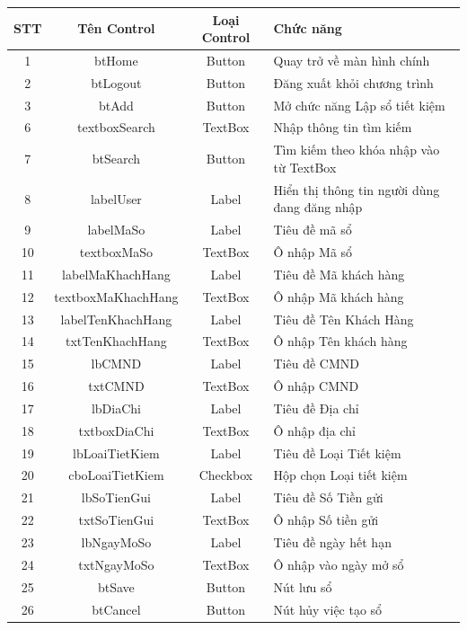 \documentclass{article}
\begin{document}
\begin{enumerate}
\begin{enumerate}
\begin{tabular}{|c|c|c| p{5cm}|}
							\hline
							STT & Tên Control & Loại Control & Chức năng \\
							\hline
							1 & btHome & Button & Quay trở về màn hình chính\\
							\hline
							2 & btLogout & Button & Đăng xuất khỏi chương trình \\
							\hline
							3 & btAdd & Button & Mở chức năng Lập sổ tiết kiệm \\
							\hline
							6 & textboxSearch & TextBox & Nhập thông tin tìm kiếm \\
							\hline
							7 & btSearch & Button & Tìm kiếm theo khóa nhập vào từ TextBox\\
							\hline
							8 & labelUser & Label & Hiển thị thông tin người dùng đang đăng nhập\\
							\hline
							9 & labelMaSo & Label & Tiêu đề mã sổ \\
							\hline
							10 & textboxMaSo & TextBox & Ô nhập Mã sổ \\
							\hline
							11 & labelMaKhachHang & Label & Tiêu đề Mã khách hàng \\
							\hline
							12 & textboxMaKhachHang & TextBox & Ô nhập Mã khách hàng \\
							\hline
							13 & labelTenKhachHang & Label & Tiêu đề Tên Khách Hàng \\
							\hline
							14 & txtTenKhachHang & TextBox & Ô nhập Tên khách hàng \\
							\hline
							15 & lbCMND & Label & Tiêu đề CMND \\
							\hline
							16 & txtCMND & TextBox & Ô nhập CMND\\
							\hline
							17 & lbDiaChi & Label & Tiêu đề Địa chỉ\\
							\hline
							18 & txtboxDiaChi & TextBox & Ô nhập địa chỉ\\
							\hline
							19 & lbLoaiTietKiem & Label & Tiêu đề Loại Tiết kiệm\\
							\hline
							20 & cboLoaiTietKiem & Checkbox & Hộp chọn Loại tiết kiệm\\
							\hline
							21 & lbSoTienGui & Label & Tiêu đề Số Tiền gửi\\
							\hline
							22 & txtSoTienGui & TextBox & Ô nhập Số tiền gửi\\
							\hline
							23 & lbNgayMoSo & Label & Tiêu đề ngày hết hạn\\
							\hline
							24 & txtNgayMoSo & TextBox & Ô nhập vào ngày mở sổ\\
							\hline
							25 & btSave & Button & Nút lưu sổ\\
							\hline
							26 & btCancel & Button & Nút hủy việc tạo sổ\\
							\hline
						\end{tabular}
						

\end{enumerate}
\end{enumerate}
\end{document}
